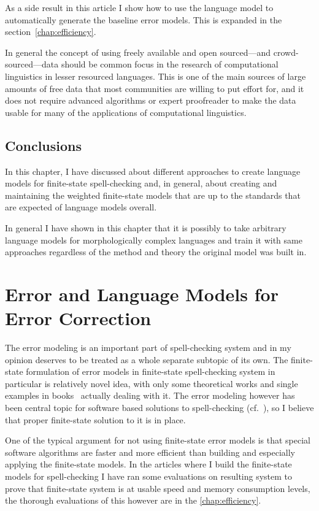 \documentclass[officiallayout]{unihelcompling}
\begin{document}
As a side result in this article I show how to use the language model to
automatically generate the baseline error models. This is expanded in
the section~\ref{chap:efficiency}.

In general the concept of using freely available and open sourced---and
crowd-sourced---data should be common focus in the research of computational
linguistics in lesser resourced languages. This is one of the main sources of
large amounts of free data that most communities are willing to put effort for,
and it does not require advanced algorithms or expert proofreader to make the
data usable for many of the applications of computational linguistics.

\section{Conclusions}

In this chapter, I have discussed about different approaches to create language
models for finite-state spell-checking and, in general, about creating and
maintaining the weighted finite-state models that are up to the standards that
are expected of language models overall. 

In general I have shown in this chapter that it is possibly to take arbitrary
language models for morphologically complex languages and train it with same
approaches regardless of the method and theory the original model was built in.


\chapter{Error and Language Models for Error Correction}
\label{chap:error-models}

The error modeling is an important part of spell-checking system and in my
opinion deserves to be treated as a whole separate subtopic of its own. The
finite-state formulation of error models in finite-state spell-checking system
in particular is relatively novel idea, with only some theoretical works
\citep{agata2002typographical,mohri2003edit} and single examples in
books~\citep{beesley2003finite} actually dealing with it. The error modeling
however has been central topic for software based solutions to spell-checking
(cf.~\citep{kukich1992spelling,mitton2009ordering,deorowicz2005correcting}), so
I believe that proper finite-state solution to it is in place.

One of the typical argument for not using finite-state error models is that
special software algorithms are faster and more efficient than building and
especially applying the finite-state models. In the articles where I build
the finite-state models for spell-checking I have ran some evaluations on
resulting system to prove that finite-state system is at usable speed
and memory consumption levels, the thorough evaluations of this however
are in the \ref{chap:efficiency}.
\end{document}

